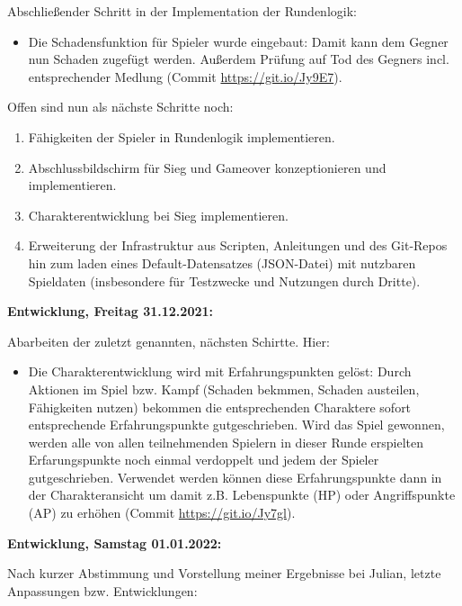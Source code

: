 Abschließender Schritt in der Implementation der Rundenlogik:

\begin{itemize}
    \item Die Schadensfunktion für Spieler wurde eingebaut: Damit kann dem Gegner nun Schaden zugefügt werden. Außerdem Prüfung auf Tod des Gegners incl. entsprechender Medlung (Commit \url{https://git.io/Jy9E7}).
\end{itemize}

Offen sind nun als nächste Schritte noch:
\begin{enumerate}
    \item Fähigkeiten der Spieler in Rundenlogik implementieren.
    \item Abschlussbildschirm für Sieg und Gameover konzeptionieren und implementieren. 
    \item Charakterentwicklung bei Sieg implementieren.
    \item Erweiterung der Infrastruktur aus Scripten, Anleitungen und des Git-Repos hin zum laden eines Default-Datensatzes (JSON-Datei) mit nutzbaren Spieldaten (insbesondere für Testzwecke und Nutzungen durch Dritte).
\end{enumerate}


\textbf{Entwicklung, Freitag 31.12.2021:}

Abarbeiten der zuletzt genannten, nächsten Schirtte. Hier: 

\begin{itemize}
    \item Die Charakterentwicklung wird mit Erfahrungspunkten gelöst: Durch Aktionen im Spiel bzw. Kampf (Schaden bekmmen, Schaden austeilen, Fähigkeiten nutzen) bekommen die entsprechenden Charaktere sofort entsprechende Erfahrungspunkte gutgeschrieben. Wird das Spiel gewonnen, werden alle von allen teilnehmenden Spielern in dieser Runde erspielten Erfarungspunkte noch einmal verdoppelt und jedem der Spieler gutgeschrieben. Verwendet werden können diese Erfahrungspunkte dann in der Charakteransicht um damit z.B. Lebenspunkte (HP) oder Angriffspunkte (AP) zu erhöhen (Commit \url{https://git.io/Jy7gl}).
\end{itemize}


\textbf{Entwicklung, Samstag 01.01.2022:}

Nach kurzer Abstimmung und Vorstellung meiner Ergebnisse bei Julian, letzte Anpassungen bzw. Entwicklungen: 

